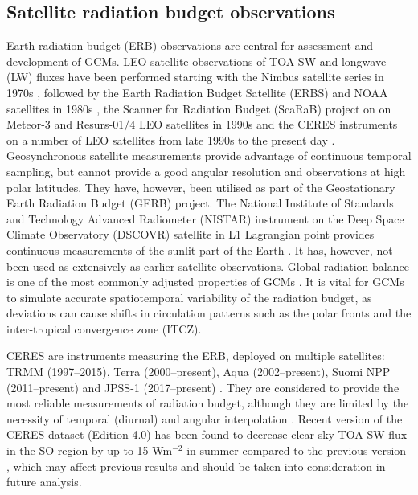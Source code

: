 \subsection{Satellite radiation budget observations}

Earth radiation budget (ERB) observations are central for assessment and development
of GCMs. LEO satellite observations of TOA SW and longwave (LW) fluxes
have been performed starting with the Nimbus satellite series in 1970s
\citep{smith1977}, followed by the Earth Radiation Budget Satellite (ERBS) and NOAA
satellites in 1980s \citep{barkstrom1984}, the Scanner for Radiation Budget (ScaRaB)
project on on Meteor-3 and Resurs-01/4 LEO satellites in 1990s \citep{kandel1994}
and the
CERES instruments on a number of LEO satellites from late 1990s
to the present day \citep{wielicki1996}. Geosynchronous satellite measurements
provide advantage of continuous temporal sampling, but cannot provide a
good angular resolution and observations at high polar latitudes. They have,
however, been utilised as part of the Geostationary Earth Radiation Budget (GERB)
project.
The National Institute of Standards and Technology Advanced Radiometer (NISTAR)
instrument on the Deep Space Climate Observatory (DSCOVR) satellite in L1 Lagrangian point provides continuous
measurements of the sunlit part of the Earth \citep{khlopenkov2017}. It has,
however, not been used
as extensively as earlier satellite observations. Global radiation balance
is one of the most commonly adjusted properties of GCMs
\citep{hourdin2017,schmidt2017}. It is vital for GCMs to simulate accurate
spatiotemporal variability of the radiation budget, as deviations can cause
shifts in circulation patterns such as the polar fronts and
the inter-tropical convergence zone (ITCZ).

CERES are instruments measuring the ERB,
deployed on multiple satellites:
TRMM (1997--2015), Terra (2000--present), Aqua (2002--present), Suomi NPP (2011--present) and JPSS-1
(2017--present) \citep{damadeo2017}. They are
considered to provide the most reliable measurements of radiation budget,
although they are limited by the necessity of temporal (diurnal) and angular
interpolation \citep{smith2011}.
Recent version of the CERES dataset (Edition 4.0) has been found to decrease
clear-sky TOA SW flux in the SO region by up to 15 Wm$^{-2}$
in summer compared to the previous version \citep{loeb2017},
which may affect previous results and should be taken into consideration in
future analysis.

